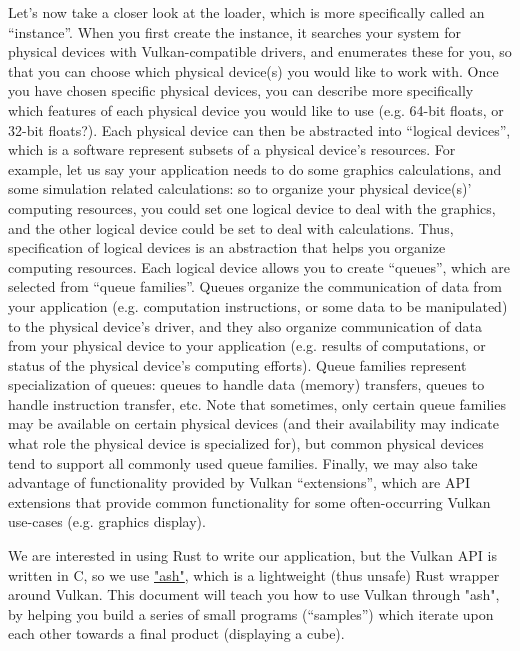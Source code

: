 \documentclass[12pt,letterpaper]{article}
\newcommand{\inquotes}[1]{``#1''}	%
\begin{document}
Let's now take a closer look at the loader, which is more specifically called an \inquotes{instance}. When you first create the instance, it searches your system for physical devices with Vulkan-compatible drivers, and enumerates these for you, so that you can choose which physical device(s) you would like to work with. Once you have chosen specific physical devices, you can describe more specifically which features of each physical device you would like to use (e.g. 64-bit floats, or 32-bit floats?). Each physical device can then be abstracted into \inquotes{logical devices}, which is a software represent subsets of a physical device's resources. For example, let us say your application needs to do some graphics calculations, and some simulation related calculations: so to organize your physical device(s)' computing resources, you could set one logical device to deal with the graphics, and the other logical device could be set to deal with calculations. Thus, specification of logical devices is an abstraction that helps you organize computing resources. Each logical device allows you to create \inquotes{queues}, which are selected from \inquotes{queue families}. Queues organize the communication of data from your application (e.g. computation instructions, or some data to be manipulated) to the physical device's driver, and they also organize communication of data from your physical device to your application (e.g. results of computations, or status of the physical device's computing efforts). Queue families represent specialization of queues: queues to handle data (memory) transfers, queues to handle instruction transfer, etc. Note that sometimes, only certain queue families may be available on certain physical devices (and their availability may indicate what role the physical device is specialized for), but common physical devices tend to support all commonly used queue families. Finally, we may also take advantage of functionality provided by Vulkan \inquotes{extensions}, which are API extensions that provide common functionality for some often-occurring Vulkan use-cases (e.g. graphics display).

We are interested in using Rust to write our application, but the Vulkan API is written in C, so we use \href{https://github.com/MaikKlein/ash}{"ash"}, which is a lightweight (thus unsafe) Rust wrapper around Vulkan. This document will teach you how to use Vulkan through "ash", by helping you build a series of small programs (\inquotes{samples}) which iterate upon each other towards a final product (displaying a cube). 
\end{document}

